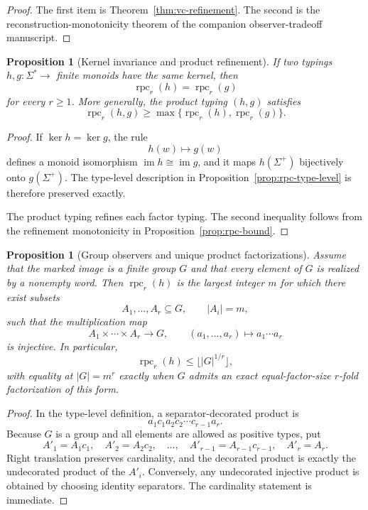 \documentclass[11pt]{article}
\newtheorem{proposition}[theorem]{Proposition}
\begin{document}
\begin{proof}
The first item is Theorem~\ref{thm:vc-refinement}.  The second is the
reconstruction-monotonicity theorem of the companion observer-tradeoff
manuscript.
\end{proof}

\begin{proposition}[Kernel invariance and product refinement]
\label{prop:rpc-kernel}
If two typings \(h,g:\Sigma^*\to\) finite monoids have the same kernel, then
\[
 \operatorname{rpc}_r(h)=\operatorname{rpc}_r(g)
\]
for every \(r\ge1\).  More generally, the product typing \((h,g)\) satisfies
\[
 \operatorname{rpc}_r(h,g)\ge
 \max\{\operatorname{rpc}_r(h),\operatorname{rpc}_r(g)\}.
\]
\end{proposition}

\begin{proof}
If \(\ker h=\ker g\), the rule
\[
 h(w)\longmapsto g(w)
\]
defines a monoid isomorphism
\(\operatorname{im}h\cong\operatorname{im}g\), and it maps
\(h(\Sigma^+)\) bijectively onto \(g(\Sigma^+)\).  The type-level
description in Proposition~\ref{prop:rpc-type-level} is therefore preserved
exactly.

The product typing refines each factor typing.  The second inequality follows
from the refinement monotonicity in Proposition~\ref{prop:rpc-bound}.
\end{proof}

\begin{proposition}[Group observers and unique product factorizations]
\label{prop:rpc-group}
Assume that the marked image is a finite group \(G\) and that every element
of \(G\) is realized by a nonempty word. Then \(\operatorname{rpc}_r(h)\)
is the largest integer \(m\) for which there exist subsets
\[
 A_1,\ldots,A_r\subseteq G,\qquad |A_i|=m,
\]
such that the multiplication map
\[
 A_1\times\cdots\times A_r\longrightarrow G,\qquad
 (a_1,\ldots,a_r)\longmapsto a_1\cdots a_r
\]
is injective. In particular,
\[
 \operatorname{rpc}_r(h)\le\lfloor |G|^{1/r}\rfloor,
\]
with equality at \(|G|=m^r\) exactly when \(G\) admits an exact
equal-factor-size \(r\)-fold factorization of this form.
\end{proposition}

\begin{proof}
In the type-level definition, a separator-decorated product is
\[
 a_1c_1a_2c_2\cdots c_{r-1}a_r.
\]
Because \(G\) is a group and all elements are allowed as positive types, put
\[
 A'_1=A_1c_1,\quad A'_2=A_2c_2,\quad\ldots,\quad
 A'_{r-1}=A_{r-1}c_{r-1},\quad A'_r=A_r.
\]
Right translation preserves cardinality, and the decorated product is
exactly the undecorated product of the \(A'_i\). Conversely, any undecorated
injective product is obtained by choosing identity separators. The
cardinality statement is immediate.
\end{proof}
\end{document}

